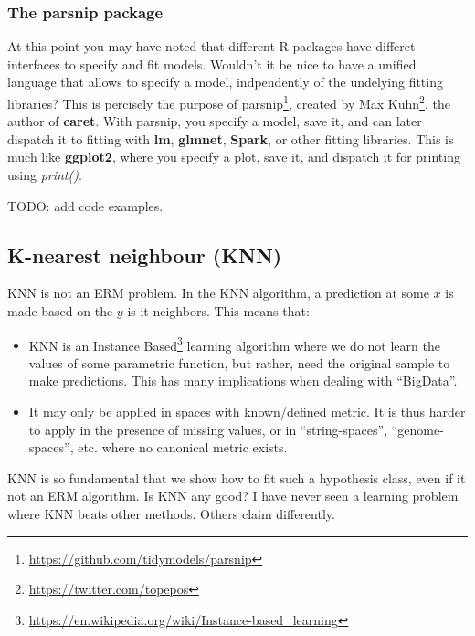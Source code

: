 \documentclass[]{book}
\providecommand{\tightlist}{%
  \setlength{\itemsep}{0pt}\setlength{\parskip}{0pt}}
\renewcommand{\href}[2]{#2\footnote{\url{#1}}}
\theoremstyle{definition}
\theoremstyle{definition}
\theoremstyle{definition}
\theoremstyle{remark}
\begin{document}
\hypertarget{parsnip}{%
\subsubsection{The parsnip package}\label{parsnip}}

At this point you may have noted that different R packages have differet interfaces to specify and fit models.
Wouldn't it be nice to have a unified language that allows to specify a model, indpendently of the undelying fitting libraries?
This is percisely the purpose of \href{https://github.com/tidymodels/parsnip}{parsnip}, created by \href{https://twitter.com/topepos}{Max Kuhn}, the author of \textbf{caret}.
With parsnip, you specify a model, save it, and can later dispatch it to fitting with \textbf{lm}, \textbf{glmnet}, \textbf{Spark}, or other fitting libraries.
This is much like \textbf{ggplot2}, where you specify a plot, save it, and dispatch it for printing using \emph{print()}.

TODO: add code examples.

\hypertarget{k-nearest-neighbour-knn}{%
\subsection{K-nearest neighbour (KNN)}\label{k-nearest-neighbour-knn}}

KNN is not an ERM problem.
In the KNN algorithm, a prediction at some \(x\) is made based on the \(y\) is it neighbors.
This means that:

\begin{itemize}
\tightlist
\item
  KNN is an \href{https://en.wikipedia.org/wiki/Instance-based_learning}{Instance Based} learning algorithm where we do not learn the values of some parametric function, but rather, need the original sample to make predictions. This has many implications when dealing with ``BigData''.
\item
  It may only be applied in spaces with known/defined metric. It is thus harder to apply in the presence of missing values, or in ``string-spaces'', ``genome-spaces'', etc. where no canonical metric exists.
\end{itemize}

KNN is so fundamental that we show how to fit such a hypothesis class, even if it not an ERM algorithm.
Is KNN any good?
I have never seen a learning problem where KNN beats other methods. Others claim differently.
\end{document}
